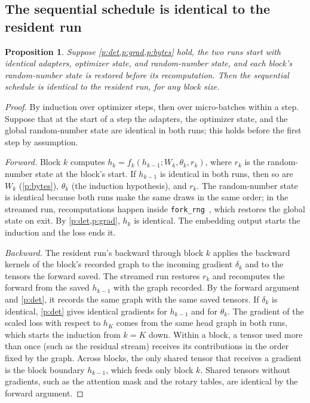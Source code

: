 \documentclass[11pt,letterpaper]{article}
\theoremstyle{definition}
\theoremstyle{plain}
\newtheorem{proposition}{Proposition}
\newcommand{\code}[1]{\texttt{\small #1}}
\begin{document}
\subsection{The sequential schedule is identical to the resident run}

\begin{proposition}\label{prop:seq}
Suppose \cref{p:det,p:grad,p:bytes} hold, the two runs start with
identical adapters, optimizer state, and random-number state, and each
block's random-number state is restored before its recomputation.
Then the sequential schedule is identical to the resident run, for any
block size.
\end{proposition}

\begin{proof}
By induction over optimizer steps, then over micro-batches within a step.
Suppose that at the start of a step the adapters, the optimizer state,
and the global random-number state are identical in both runs; this holds
before the first step by assumption.

\emph{Forward.}
Block $k$ computes $h_k=f_k(h_{k-1};W_k,\theta_k,r_k)$, where $r_k$ is
the random-number state at the block's start.
If $h_{k-1}$ is identical in both runs, then so are $W_k$ (\cref{p:bytes}),
$\theta_k$ (the induction hypothesis), and $r_k$.
The random-number state is identical because both runs make the same draws
in the same order; in the streamed run, recomputations happen inside
\code{fork\_rng}~\cite{pytorch_checkpoint}, which restores the global
state on exit.
By \cref{p:det,p:grad}, $h_k$ is identical.
The embedding output starts the induction and the loss ends it.

\emph{Backward.}
The resident run's backward through block $k$ applies the backward
kernels of the block's recorded graph to the incoming gradient $\delta_k$
and to the tensors the forward saved.
The streamed run restores $r_k$ and recomputes the forward from the saved
$h_{k-1}$ with the graph recorded.
By the forward argument and \cref{p:det}, it records the same graph with
the same saved tensors.
If $\delta_k$ is identical, \cref{p:det} gives identical gradients for
$h_{k-1}$ and for $\theta_k$.
The gradient of the scaled loss with respect to $h_K$ comes from the same
head graph in both runs, which starts the induction from $k=K$ down.
Within a block, a tensor used more than once (such as the residual
stream) receives its contributions in the order fixed by the graph.
Across blocks, the only shared tensor that receives a gradient is the
block boundary $h_{k-1}$, which feeds only block $k$.
Shared tensors without gradients, such as the attention mask and the
rotary tables, are identical by the forward argument.


\end{proof}
\end{document}
